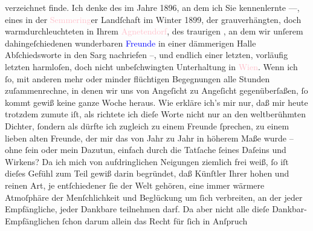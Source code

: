                verzeichnet finde. Ich denke des \label{K_L02377_2v}\label{K_L02377_2h} im Jahre 1896, an dem ich Sie kennenlernte —, eines \label{K_L02377_3v}\label{K_L02377_3h} in der \textcolor{pink}{Semmering}{}\ledrightnote{\textcolor{pink}{Semmering}}er Landſchaft im
                  Winter 1899, der grauverhängten, doch warmdurchleuchteten \label{K_L02377_4v}\label{K_L02377_4h} in Ihrem \textcolor{pink}{Agnetendorf}{}\ledrightnote{\textcolor{pink}{Agnetendorf}}, des traurigen \label{K_L02377_5v}\label{K_L02377_5h}, an dem wir unſerem dahingeſchiedenen wunderbaren \textcolor{blue}{Freunde}{} in einer dämmerigen Halle
               Abſchiedsworte in den Sarg nachriefen –, und endlich einer letzten, vorläufig letzten
               harmloſen, doch nicht unbeſchwingten Unterhaltung in \textcolor{pink}{Wien}{}\ledrightnote{\textcolor{pink}{Wien}}. Wenn ich ſo, mit anderen mehr oder minder flüchtigen Begegnungen alle
               Stunden zuſammenrechne, in denen wir uns von Angeſicht zu Angeſicht gegenüberſaßen,
               ſo kommt gewiß keine ganze Woche heraus. Wie erkläre ich’s mir nur, daß mir heute
               trotzdem zumute iſt, als richtete ich dieſe Worte nicht nur an den weltberühmten
               Dichter, ſondern als dürfte ich zugleich zu einem Freunde ſprechen, zu einem lieben
               alten Freunde, der mir das von Jahr zu Jahr in höherem Maße wurde – ohne ſein oder
               mein Dazutun, einfach durch die Tatſache ſeines Daſeins und Wirkens? Da ich mich von
               aufdringlichen Neigungen ziemlich frei weiß, ſo iſt dieſes Gefühl zum Teil gewiß
               darin begründet, daß Künſtler Ihrer hohen und reinen Art, je entſchiedener ſie der
               Welt gehören, eine immer wärmere Atmoſphäre der Menſchlichkeit und Beglückung um ſich
               verbreiten, an der jeder Empfängliche, jeder Dankbare teilnehmen darf. Da aber nicht
               alle dieſe Dankbar-Empfänglichen ſchon darum allein das Recht für ſich in Anſpruch
